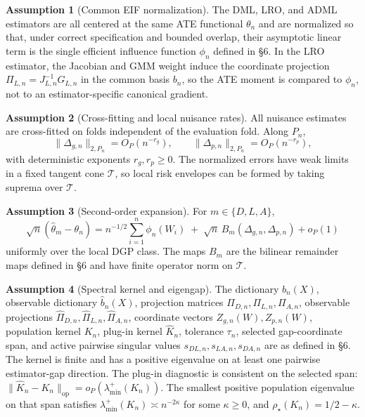 \documentclass[11pt]{article}
\theoremstyle{definition}
\newtheorem{assumption}{Assumption}
\theoremstyle{plain}
\theoremstyle{remark}
\begin{document}
\begin{assumption}[Common EIF normalization]\label{ass:eif-normalization}
The DML, LRO, and ADML estimators are all centered at the same ATE functional
\(\theta_n\) and are normalized so that, under correct specification and
bounded overlap, their asymptotic linear term is the single efficient influence
function \(\phi_n\) defined in \S6.  In the LRO estimator, the Jacobian and GMM
weight induce the coordinate projection
\(\Pi_{L,n}=J_{L,n}^{-1}G_{L,n}\) in the common basis \(b_n\), so the ATE moment
is compared to \(\phi_n\), not to an estimator-specific canonical gradient.
\end{assumption}

\begin{assumption}[Cross-fitting and local nuisance rates]\label{ass:rates}
All nuisance estimates are cross-fitted on folds independent of the evaluation
fold.  Along \(P_n\),
\[
\|\Delta_{g,n}\|_{2,P_n}=O_P(n^{-r_g}),\qquad
\|\Delta_{p,n}\|_{2,P_n}=O_P(n^{-r_p}),
\]
with deterministic exponents \(r_g,r_p\ge 0\).  The normalized errors have
weak limits in a fixed tangent cone \(\mathcal{T}\), so local risk envelopes can
be formed by taking suprema over \(\mathcal{T}\).
\end{assumption}

\begin{assumption}[Second-order expansion]\label{ass:second-order}
For \(m\in\{D,L,A\}\),
\[
\sqrt n(\hat\theta_m-\theta_n)=n^{-1/2}\sum_{i=1}^n\phi_n(W_i)
\;+\;
\sqrt n\,B_m(\Delta_{g,n},\Delta_{p,n})+o_P(1)
\]
uniformly over the local DGP class.  The maps \(B_m\) are the bilinear
remainder maps defined in \S6 and have finite operator norm on \(\mathcal{T}\).
\end{assumption}

\begin{assumption}[Spectral kernel and eigengap]\label{ass:spectral-kernel}
The dictionary \(b_n(X)\), observable dictionary \(\hat b_n(X)\), projection
matrices \(\Pi_{D,n},\Pi_{L,n},\Pi_{A,n}\), observable projections
\(\hat\Pi_{D,n},\hat\Pi_{L,n},\hat\Pi_{A,n}\), coordinate vectors
\(Z_{g,n}(W),Z_{p,n}(W)\), population kernel \(K_n\), plug-in kernel
\(\hat K_n\), tolerance \(\tau_n\), selected gap-coordinate span, and active
pairwise singular values \(s_{DL,n},s_{LA,n},s_{DA,n}\) are as
defined in \S6.  The kernel is finite and has a positive eigenvalue on at least
one pairwise estimator-gap direction.  The plug-in diagnostic is consistent on
the selected span:
\(\|\hat K_n-K_n\|_{\mathrm{op}}=o_P(\lambda_{\min}^+(K_n))\).  The smallest
positive population eigenvalue on that span satisfies
\(\lambda_{\min}^+(K_n)\asymp n^{-2\kappa}\) for some \(\kappa\ge 0\), and
\(\rho_\star(K_n)=1/2-\kappa\).
\end{assumption}
\end{document}
